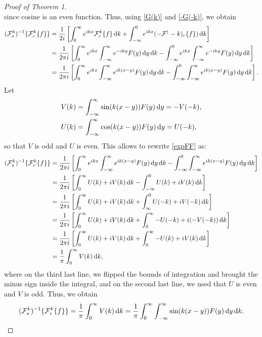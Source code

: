 \documentclass[10pt,reqno,oneside,a4paper]{article}
\begin{document}
\begin{proof}[Proof of Theorem 1]
\begin{equation}
\end{equation}
since cosine is an even function. Thus, using \eqref{G(k)} and \eqref{-G(-k)}, we obtain
\begin{align}
(\mathcal{F}^k_s)^{-1} \{ \mathcal{F}^k_c \{ f \} \} &= \frac{1}{2i} \left[ \int^{\infty}_0 e^{ikx} \mathcal{F}^k_c \{ f \} \,\mathrm{d} k + \int_{-\infty}^0 e^{ikx} (-\mathcal{F}^(-k)_c \{ f \}) \,\mathrm{d} k\right] \nonumber \\
&= \frac{1}{2\pi i} \left[ \int^{\infty}_0 e^{ikx}  \int_{-\infty}^\infty e^{-iky} F(y) \,\mathrm{d} y \,\mathrm{d} k - \int_{-\infty}^0 e^{ikx} \int_{-\infty}^\infty e^{-iky} F(y) \,\mathrm{d} y \,\mathrm{d} k\right] \nonumber \\
&= \frac{1}{2\pi i} \left[ \int^{\infty}_0 e^{ikx} \int_{-\infty}^\infty e^{ik(x-y)} F(y) \,\mathrm{d} y \,\mathrm{d} k - \int_{-\infty}^0 \int_{-\infty}^\infty e^{ik(x-y)} F(y) \,\mathrm{d} y \,\mathrm{d} k\right]. \label{expFF}
\end{align}
Let
\begin{align*}
V(k) &= \int_{-\infty}^\infty \sin(k(x-y)) F(y) \,\mathrm{d} y = -V(-k), \\
U(k) &= \int_{-\infty}^\infty \cos(k(x-y)) F(y) \,\mathrm{d} y = U(-k),
\end{align*}
so that $V$ is odd and $U$ is even. This allows to rewrite \eqref{expFF} as:
\begin{align*}
(\mathcal{F}^k_s)^{-1} \{ \mathcal{F}^k_c \{ f \} \} &= \frac{1}{2\pi i} \left[ \int^{\infty}_0 e^{ikx} \int_{-\infty}^\infty e^{ik(x-y)} F(y) \,\mathrm{d} y \,\mathrm{d} k - \int_{-\infty}^0 \int_{-\infty}^\infty e^{ik(x-y)} F(y) \,\mathrm{d} y \,\mathrm{d} k\right] \\
&= \frac{1}{2\pi i} \left[ \int^{\infty}_0 U(k) +i V(k) \,\mathrm{d} k - \int_{-\infty}^0 U(k) + i V(k) \,\mathrm{d} k\right] \\
&= \frac{1}{2\pi i} \left[ \int^{\infty}_0 U(k) +i V(k) \,\mathrm{d} k + \int_{\infty}^0 U(-k) + i V(-k) \,\mathrm{d} k\right] \\
&= \frac{1}{2\pi i} \left[ \int^{\infty}_0 U(k) +i V(k) \,\mathrm{d} k + \int^{\infty}_0 -U(-k) + i (-V(-k)) \,\mathrm{d} k\right] \\
&= \frac{1}{2\pi i} \left[ \int^{\infty}_0 U(k) +i V(k) \,\mathrm{d} k + \int^{\infty}_0 -U(k) + i V(k) \,\mathrm{d} k\right] \\
&= \frac{1}{\pi } \int^{\infty}_0 V(k) \,\mathrm{d} k,
\end{align*}
where on the third last line, we flipped the bounds of integration and brought the minus sign inside the integral, and on the second last line, we used that $U$ is even and $V$ is odd. Thus, we obtain 
\[ 
(\mathcal{F}^k_s)^{-1} \{ \mathcal{F}^k_c \{ f \} \} = \frac{1}{\pi } \int^{\infty}_0 V(k) \,\mathrm{d} k =  \frac{1}{\pi} \int^{\infty}_0 \int_{-\infty}^\infty \sin(k(x-y)) F(y) \,\mathrm{d} y \,\mathrm{d} k.
\]
\end{proof}
\end{document}
